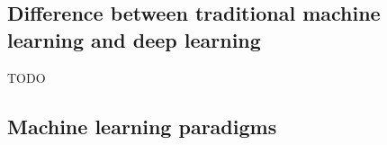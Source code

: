 




\subsection{Difference between traditional machine learning and deep learning}
\label{subsec:processing_signals_ml_and_dl_difference}


TODO


\subsection{Machine learning paradigms}
\label{subsec:processing_signals_ml_and_dl_tyes_of_learning_supervision}



